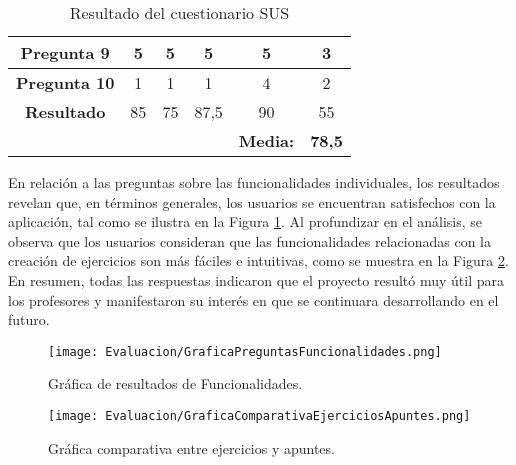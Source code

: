 \begin{table}[H]
{\begin{tabular}{cccc|c|c|}
            \multicolumn{1}{|c|}{\textbf{Pregunta 9}}  & \multicolumn{1}{c|}{5}                  & \multicolumn{1}{c|}{5}                  & 5                         & 5                       & 3                       \\ \hline
            \multicolumn{1}{|c|}{\textbf{Pregunta 10}} & \multicolumn{1}{c|}{1}                  & \multicolumn{1}{c|}{1}                  & 1                         & 4                       & 2                       \\ \hline
            \multicolumn{1}{|c|}{\textbf{Resultado}}   & \multicolumn{1}{c|}{85}                 & \multicolumn{1}{c|}{75}                 & \multicolumn{1}{c|}{87,5} & \multicolumn{1}{c|}{90} & \multicolumn{1}{c|}{55} \\ \hline
            \multicolumn{1}{l}{}                       & \multicolumn{1}{l}{}                    & \multicolumn{1}{l}{}                    & \multicolumn{1}{l|}{}     & \textbf{Media:}         & \textbf{78,5}           \\ \cline{5-6}
        \end{tabular}
    }
    \caption{Resultado del cuestionario SUS}
    \label{tab:puntuacionSUS}
\end{table}

En relación a las preguntas sobre las funcionalidades individuales, los resultados revelan que, en términos generales, los usuarios se encuentran satisfechos con la aplicación, tal como se ilustra en la Figura \ref{fig:graficaPreguntasFuncionalidades}. Al profundizar en el análisis, se observa que los usuarios consideran que las funcionalidades relacionadas con la creación de ejercicios son más fáciles e intuitivas, como se muestra en la Figura \ref{fig:graficaComparativaEjerciciosApuntes}. En resumen, todas las respuestas indicaron que el proyecto resultó muy útil para los profesores y manifestaron su interés en que se continuara desarrollando en el futuro.

\begin{figure}[H]
    \centering
    \texttt{[image: Evaluacion/GraficaPreguntasFuncionalidades.png]}
    \caption{Gráfica de resultados de Funcionalidades.}
    \label{fig:graficaPreguntasFuncionalidades}
\end{figure}

\begin{figure}[H]
    \centering
    \texttt{[image: Evaluacion/GraficaComparativaEjerciciosApuntes.png]}
    \caption{Gráfica comparativa entre ejercicios y apuntes.}
    \label{fig:graficaComparativaEjerciciosApuntes}
\end{figure}

